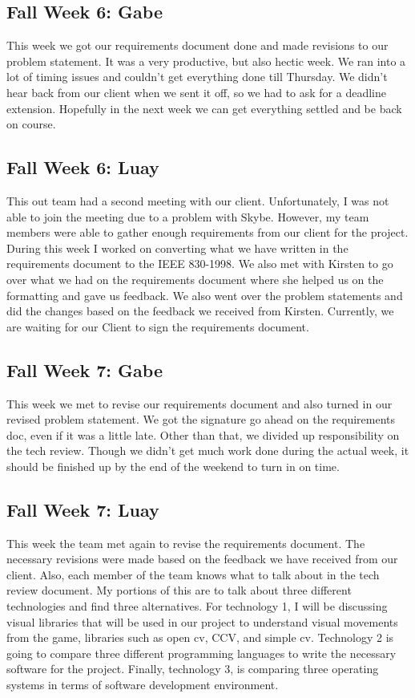 \documentclass[onecolumn, draftclsnofoot,10pt, compsoc]{IEEEtran}
\begin{document}
\subsection{Fall Week 6: Gabe}
This week we got our requirements document done and made revisions to our problem statement. It was a very productive, but also hectic week. We ran into a lot of timing issues and couldn't get everything done till Thursday. We didn't hear back from our client when we sent it off, so we had to ask for a deadline extension. Hopefully in the next week we can get everything settled and be back on course.
\subsection{Fall Week 6: Luay}
This out team had a second meeting with our client. Unfortunately, I was not able to join the meeting due to a problem with Skybe. However, my team members were able to gather enough requirements from our client for the project. During this week I worked on converting what we have written in the requirements document to the IEEE 830-1998. We also met with Kirsten to go over what we had on the requirements document where she helped us on the formatting and gave us feedback. We also went over the problem statements and did the changes based on the feedback we received from Kirsten. Currently, we are waiting for our Client to sign the requirements document.
\subsection{Fall Week 7: Gabe}
This week we met to revise our requirements document and also turned in our revised problem statement. We got the signature go ahead on the requirements doc, even if it was a little late. Other than that, we divided up responsibility on the tech review. Though we didn't get much work done during the actual week, it should be finished up by the end of the weekend to turn in on time.
\subsection{Fall Week 7: Luay}
This week the team met again to revise the requirements document. The necessary revisions were made based on the feedback we have received from our client. Also, each member of the team knows what to talk about in the tech review document. My portions of this are to talk about three different technologies and find three alternatives. For technology 1, I will be discussing visual libraries that will be used in our project to understand visual movements from the game, libraries such as open cv, CCV, and simple cv. Technology 2 is going to compare three different programming languages to write the necessary software for the project. Finally, technology 3, is comparing three operating systems in terms of software development environment.
\end{document}
